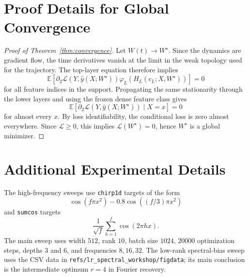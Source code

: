 \documentclass{article}
\newcommand{\E}{\mathbb{E}}
\newcommand{\calL}{\mathcal{L}}
\newcommand{\scrL}{\mathcal{L}}
\begin{document}
\section{Proof Details for Global Convergence}
\label{app:global-proof}

\begin{proof}[Proof of Theorem~\ref{thm:convergence}]
Let $W(t)\to W^\star$. Since the dynamics are gradient flow, the time derivatives vanish at the limit in the weak topology used for the trajectory. The top-layer equation therefore implies
\begin{equation}
\E\left[\partial_2\calL(Y,\hat y(X;W^\star))
\varphi_L(H_L(c_L;X,W^\star))\right]=0
\end{equation}
for all feature indices in the support. Propagating the same stationarity through the lower layers and using the frozen dense feature class gives
\begin{equation}
\E\left[\partial_2\calL(Y,\hat y(X;W^\star))\mid X=x\right]=0
\end{equation}
for almost every $x$. By loss identifiability, the conditional loss is zero almost everywhere. Since $\calL\ge0$, this implies $\scrL(W^\star)=0$, hence $W^\star$ is a global minimizer.
\end{proof}

\section{Additional Experimental Details}
\label{app:exp-details}

The high-frequency sweeps use \texttt{chirp1d} targets of the form
\begin{equation}
\cos(f\pi x^2)-0.8\cos((f/3)\pi x^2)
\end{equation}
and \texttt{sumcos} targets
\begin{equation}
\frac{1}{\sqrt f}\sum_{h=1}^{f}\cos(2\pi h x).
\end{equation}
The main sweep uses width $512$, rank $10$, batch size $1024$, $20000$ optimization steps, depths $3$ and $6$, and frequencies $8,16,32$. The low-rank spectral-bias sweep uses the CSV data in \texttt{refs/lr\_spectral\_workshop/figdata}; its main conclusion is the intermediate optimum $r=4$ in Fourier recovery.
\end{document}
